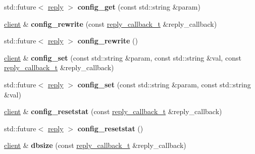 \begin{DoxyCompactItemize}
std\+::future$<$ \hyperlink{classcpp__redis_1_1reply}{reply} $>$ {\bfseries config\+\_\+get} (const std\+::string \&param)
\item 
\mbox{\label{classcpp__redis_1_1client_a8dcf862a8a0cb75f8cc986445eae81cf}} 
\hyperlink{classcpp__redis_1_1client}{client} \& {\bfseries config\+\_\+rewrite} (const \hyperlink{classcpp__redis_1_1client_a061a1140d36d2eaeda82b09a0bb3f9f2}{reply\+\_\+callback\+\_\+t} \&reply\+\_\+callback)
\item 
\mbox{\label{classcpp__redis_1_1client_a1a001663bd555abb70521924ec2a27f8}} 
std\+::future$<$ \hyperlink{classcpp__redis_1_1reply}{reply} $>$ {\bfseries config\+\_\+rewrite} ()
\item 
\mbox{\label{classcpp__redis_1_1client_a0cff7147cd982a39cc84f91243a27364}} 
\hyperlink{classcpp__redis_1_1client}{client} \& {\bfseries config\+\_\+set} (const std\+::string \&param, const std\+::string \&val, const \hyperlink{classcpp__redis_1_1client_a061a1140d36d2eaeda82b09a0bb3f9f2}{reply\+\_\+callback\+\_\+t} \&reply\+\_\+callback)
\item 
\mbox{\label{classcpp__redis_1_1client_a8fdeb462b43ea6f5199145696713f9b1}} 
std\+::future$<$ \hyperlink{classcpp__redis_1_1reply}{reply} $>$ {\bfseries config\+\_\+set} (const std\+::string \&param, const std\+::string \&val)
\item 
\mbox{\label{classcpp__redis_1_1client_a4b1361aa6c997b76a059c144a302b5be}} 
\hyperlink{classcpp__redis_1_1client}{client} \& {\bfseries config\+\_\+resetstat} (const \hyperlink{classcpp__redis_1_1client_a061a1140d36d2eaeda82b09a0bb3f9f2}{reply\+\_\+callback\+\_\+t} \&reply\+\_\+callback)
\item 
\mbox{\label{classcpp__redis_1_1client_a775508ce5220546e46b573f95d2bcb4d}} 
std\+::future$<$ \hyperlink{classcpp__redis_1_1reply}{reply} $>$ {\bfseries config\+\_\+resetstat} ()
\item 
\mbox{\label{classcpp__redis_1_1client_a87a8351f0a6927db52b4ab2a5b9192c9}} 
\hyperlink{classcpp__redis_1_1client}{client} \& {\bfseries dbsize} (const \hyperlink{classcpp__redis_1_1client_a061a1140d36d2eaeda82b09a0bb3f9f2}{reply\+\_\+callback\+\_\+t} \&reply\+\_\+callback)

\end{DoxyCompactItemize}
